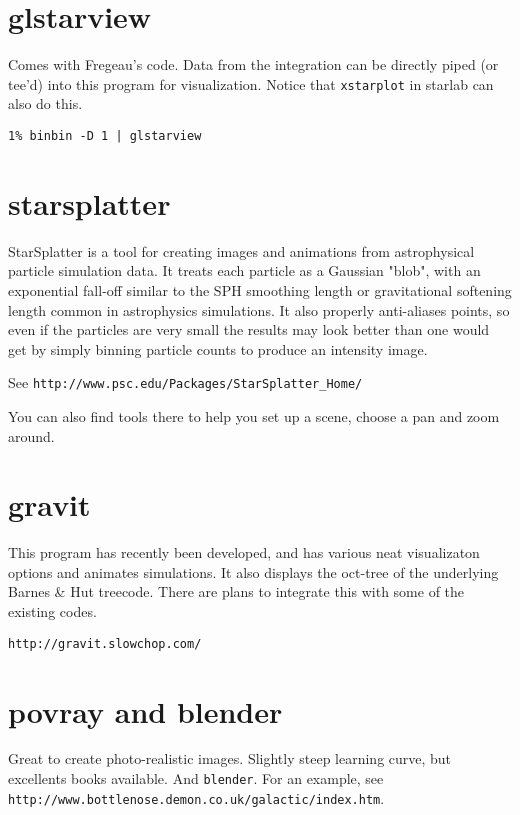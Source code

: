 {\section{glstarview}

Comes with Fregeau's code. Data from the integration can be directly  piped
(or tee'd) into this program for visualization. Notice that {\tt xstarplot}
in starlab can also do this.

\footnotesize\begin{verbatim}
1% binbin -D 1 | glstarview
\end{verbatim}\normalsize


\section{starsplatter}

StarSplatter is a tool for creating images and animations from
astrophysical particle simulation data. It treats each particle as a
Gaussian "blob", with an exponential fall-off similar to the SPH
smoothing length or gravitational softening length common in
astrophysics simulations. It also properly anti-aliases points, so
even if the particles are very small the results may look better than
one would get by simply binning particle counts to produce an
intensity image.

See {\tt http://www.psc.edu/Packages/StarSplatter\_Home/}

You can also find tools there to help you set up a scene, choose a pan and
zoom around.

\section{gravit}

This program has recently been developed, and has various neat visualizaton
options and animates simulations. It also displays the oct-tree of the
underlying Barnes \& Hut treecode. There are plans to integrate this with
some of the existing codes.

{\tt http://gravit.slowchop.com/}

\section{povray and blender}

Great to create photo-realistic images. Slightly steep learning curve, but
excellents books available. And {\tt blender}. For an example, see
{\tt http://www.bottlenose.demon.co.uk/galactic/index.htm}.

}
